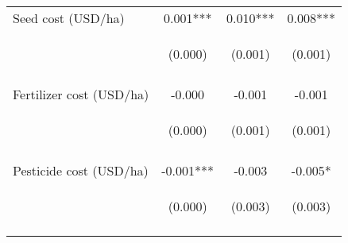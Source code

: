 \begin{center}
\begin{tabular}{lccc}
Seed cost (USD/ha) & 0.001*** & 0.010*** & 0.008*** \\
 & \begin{footnotesize}(0.000)\end{footnotesize} & \begin{footnotesize}(0.001)\end{footnotesize} & \begin{footnotesize}(0.001)\end{footnotesize} \\
\vspace{4pt} & \begin{footnotesize}[0.000]\end{footnotesize} & \begin{footnotesize}[0.000]\end{footnotesize} & \begin{footnotesize}[0.000]\end{footnotesize} \\
Fertilizer cost (USD/ha) & -0.000 & -0.001 & -0.001 \\
 & \begin{footnotesize}(0.000)\end{footnotesize} & \begin{footnotesize}(0.001)\end{footnotesize} & \begin{footnotesize}(0.001)\end{footnotesize} \\
\vspace{4pt} & \begin{footnotesize}[0.405]\end{footnotesize} & \begin{footnotesize}[0.438]\end{footnotesize} & \begin{footnotesize}[0.218]\end{footnotesize} \\
Pesticide cost (USD/ha) & -0.001*** & -0.003 & -0.005* \\
 & \begin{footnotesize}(0.000)\end{footnotesize} & \begin{footnotesize}(0.003)\end{footnotesize} & \begin{footnotesize}(0.003)\end{footnotesize} \\
\vspace{4pt} & \begin{footnotesize}[0.004]\end{footnotesize} & \begin{footnotesize}[0.217]\end{footnotesize} & \begin{footnotesize}[0.061]\end{footnotesize} \\

\end{tabular}
\end{center}

